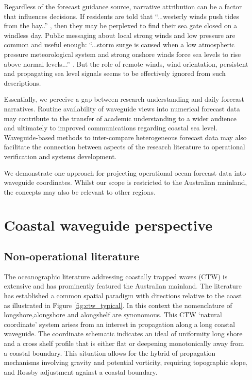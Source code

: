 Regardless of the forecast guidance source, narrative attribution can be a factor that influences decisions.  
If residents are told that ``...westerly winds push tides from the bay..'' \citep{urlMW:2018}, then they may be perplexed to find their sea gate closed on a windless day.  Public messaging about local strong winds and low pressure are common and useful enough:
``...storm surge is caused when a low atmospheric pressure meteorological system and strong onshore winds force sea levels to rise above normal levels...''
\citep{urlBris:2018}.  But the role of remote winds, wind orientation, persistent and propagating sea level signals seems to be effectively ignored from such descriptions.  


Essentially, we perceive a gap between research understanding and daily forecast narratives.
Routine availability of waveguide views into numerical forecast data may contribute to the transfer of academic understanding to a wider audience and ultimately to improved communications regarding coastal sea level.
Waveguide-based methods to inter-compare heterogeneous forecast data may also facilitate the connection between aspects of the research literature to operational verification and systems development.

We demonstrate one approach for projecting operational ocean forecast data into waveguide coordinates.  Whilst our scope is restricted to the Australian mainland, the concepts may also be relevant to other regions.


\section{Coastal waveguide perspective}
\label{sec:ctw_background}

\subsection{Non-operational literature}
The oceanographic literature addressing coastally trapped waves (CTW) is extensive and has prominently featured the Australian mainland. 
The literature has established a common spatial paradigm \citep{Brink:1991dl}  with directions relative to the coast as illustrated in Figure \ref{fig:ctw_typical}. In this context the nomenclature of longshore,alongshore and alongshelf are synonomous. This CTW `natural coordinate' system \citep{gill1982atmosphere} arises from an interest in propagation along a long coastal waveguide. The coordinate schematic indicates an ideal of uniformity long shore and a cross shelf profile that is either flat or deepening monotonically away from a coastal boundary.  
This situation allows for the hybrid of propagation mechanisms involving gravity and potential vorticity, requiring topographic slope, and Rossby adjustment against a coastal boundary.   


